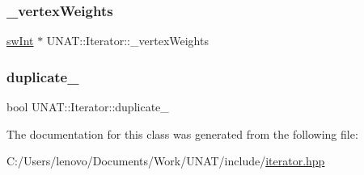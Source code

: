 \mbox{\label{classUNAT_1_1Iterator_a9da915e0a553c64ec43c299d70398f22}} 
\subsubsection{\texorpdfstring{\_vertexWeights}{\_vertexWeights}}
{\footnotesize\ttfamily \mbox{\hyperlink{include_2swMacro_8h_a113cf5f6b5377cdf3fac6aa4e443e9aa}{sw\+Int}} $\ast$ U\+N\+A\+T\+::\+Iterator\+::\+\_\+vertex\+Weights\hspace{0.3cm}{\ttfamily [private]}}

\mbox{\label{classUNAT_1_1Iterator_a3edaf3538d36c649321535de2ae0ec0d}} 
\subsubsection{\texorpdfstring{duplicate\_}{duplicate\_}}
{\footnotesize\ttfamily bool U\+N\+A\+T\+::\+Iterator\+::duplicate\+\_\+\hspace{0.3cm}{\ttfamily [private]}}



The documentation for this class was generated from the following file\+:\begin{DoxyCompactItemize}
\item 
C\+:/\+Users/lenovo/\+Documents/\+Work/\+U\+N\+A\+T/include/\mbox{\hyperlink{include_2iterator_8hpp}{iterator.\+hpp}}\end{DoxyCompactItemize}
